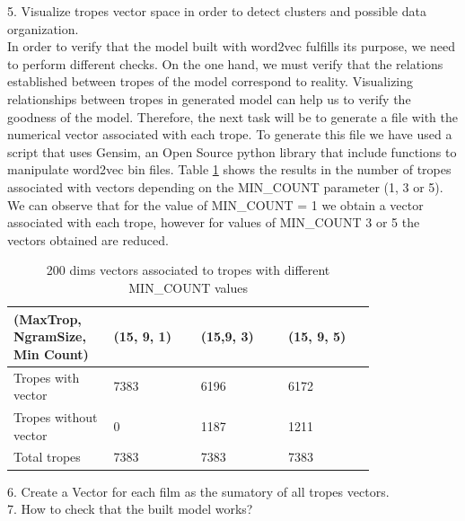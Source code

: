 \documentclass[letterpaper]{article}
\begin{document}
	
	5. Visualize tropes vector space in order to detect clusters and possible data organization. \\
	   In order to verify that the model built with word2vec fulfills its purpose, we need to perform different checks. On the one hand, 
	   we must verify that the relations established between tropes of the model correspond to reality. 
	   Visualizing relationships between tropes in generated model can help us to verify the goodness of the model.
	   Therefore, the next task will be to generate a file with the numerical vector associated with each trope. 
	   To generate this file we have used a script that uses Gensim, an Open Source python library that include functions to manipulate
	   word2vec bin files.
	   Table \ref{tab:200dims-vectors-associated-to-tropes} shows the results in the number of tropes associated with vectors depending 
	   on the MIN\_COUNT parameter (1, 3 or 5). We can observe that for the value of MIN\_COUNT = 1 we obtain a vector associated with each trope, 
	   however for values of MIN\_COUNT 3 or 5 the vectors obtained are reduced. 
	   	\begin{table}[t]
	   	\centering
	   	\begin{tabular}{|p{0.20\linewidth}|p{0.2\linewidth}|p{0.2\linewidth}|p{0.2\linewidth}|}
	   		\hline
	   		\textbf{(MaxTrop, NgramSize, Min Count)}& \textbf{(15, 9, 1)} & \textbf{(15,9, 3)} & \textbf{(15, 9, 5)}\\
	   		\hline
	   		\hline
	   		Tropes with vector&7383  & 6196 & 6172 \\
	   		\hline
	   		Tropes without vector& 0 & 1187 & 1211 \\
	   		\hline
	   		Total tropes&7383&7383&7383\\
	   		\hline
	   		
	   	\end{tabular}
	   	\caption{200 dims vectors associated to tropes with different MIN\_COUNT values}
	   	\label{tab:200dims-vectors-associated-to-tropes}
	   \end{table}	
	   
	6. Create a Vector for each film as the sumatory of all tropes vectors. \\
	
	7. How to check that the built model works?
	
\end{document}
